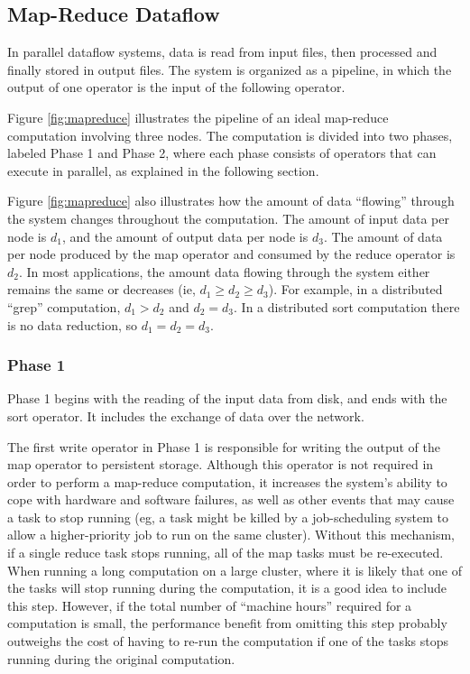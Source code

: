 \documentclass{acm_proc_article-sp}
\begin{document}
\subsection{Map-Reduce Dataflow}

In parallel dataflow systems, data is read from input files, then processed and
finally stored in output files. The system is organized as a pipeline, in which
the output of one operator is the input of the following operator.

\begin{figure*}
\begin{center}
\caption{A map-reduce dataflow.}
\label{fig:mapreduce}
\end{center}
\end{figure*}

Figure \ref{fig:mapreduce} illustrates the pipeline of an ideal map-reduce
computation involving three nodes. The computation is divided into two phases,
labeled Phase 1 and Phase 2, where each phase consists of operators that can
execute in parallel, as explained in the following section.

Figure \ref{fig:mapreduce} also illustrates how the amount of data ``flowing''
through the system changes throughout the computation. The amount of input data
per node is $d_1$, and the amount of output data per node is $d_3$. The amount
of data per node produced by the map operator and consumed by the reduce
operator is $d_2$. In most applications, the amount data flowing through the
system either remains the same or decreases (ie, $d_1 \ge d_2 \ge d_3$). For
example, in a distributed ``grep'' computation, $d_1 > d_2$ and $d_2 = d_3$. In
a distributed sort computation there is no data reduction, so $d_1 = d_2 =
d_3$.

\subsubsection{Phase 1}

Phase 1 begins with the reading of the input data from disk, and ends with the
sort operator. It includes the exchange of data over the network.

The first
write operator in Phase 1 is responsible for writing the output of the map
operator to persistent storage. Although this operator is not required in order to perform a map-reduce computation, it increases the system's ability to cope with hardware and software failures, as well as other
events that may cause a task to stop running (eg, a task might be killed by a
job-scheduling system to allow a higher-priority job to run on the same
cluster). Without this mechanism, if a single reduce task stops running, all of the map tasks must be re-executed. When running a long computation on a large cluster, where it is
likely that one of the tasks will stop running during the computation, it is a
good idea to include this step. However, if the total number of ``machine
hours'' required for a computation is small, the performance benefit from
omitting this step probably outweighs the cost of having to re-run the
computation if one of the tasks stops running during the original
computation.
\end{document}
